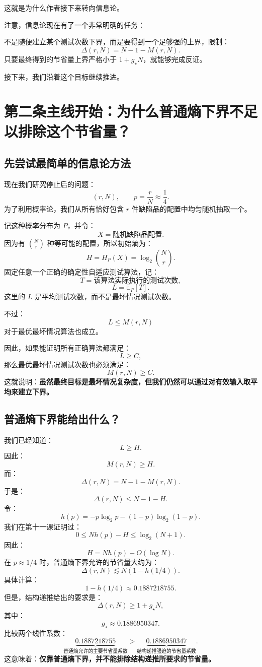 \documentclass[UTF8,11pt]{ctexart}
\begin{document}
这就是为什么作者接下来转向信息论。

注意，信息论现在有了一个非常明确的任务：

不是随便建立某个测试次数下界，而是要得到一个足够强的上界，限制：
\[\Delta(r,N)=N-1-M(r,N).\]
只要最终得到的节省量上界严格小于 $1+g_\star N$，就能够完成反证。

接下来，我们沿着这个目标继续推进。

\section{第二条主线开始：为什么普通熵下界不足以排除这个节省量？}
\subsection{先尝试最简单的信息论方法}
现在我们研究停止后的问题：
\[(r,N),\qquad p=\frac rN\approx\frac14.\]
为了利用概率论，我们从所有恰好包含 $r$ 件缺陷品的配置中均匀随机抽取一个。

记这种概率分布为 $P$，并令：
\[X=\text{随机缺陷品配置}.\]
因为有 $\binom Nr$ 种等可能的配置，所以初始熵为：
\begin{equation}\boxed{H=H_P(X)=\log_2\binom Nr.}\tag{12}\end{equation}
固定任意一个正确的确定性自适应测试算法，记：
\[T=\text{该算法实际执行的测试次数},\]
\[L=\mathbb E_P[T].\]
这里的 $L$ 是平均测试次数，而不是最坏情况测试次数。

不过：
\[L\le M(r,N)\]
对于最优最坏情况算法也成立。

因此，如果能证明所有正确算法都满足：
\[L\ge C,\]
那么最优最坏情况测试次数也必须满足：
\[M(r,N)\ge C.\]
这就说明：\textbf{虽然最终目标是最坏情况复杂度，但我们仍然可以通过对有效输入取平均来建立下界。}

\subsection{普通熵下界能给出什么？}
我们已经知道：
\[L\ge H.\]
因此：
\[M(r,N)\ge H.\]
而：
\[\Delta(r,N)=N-1-M(r,N).\]
于是：
\[\Delta(r,N)\le N-1-H.\]
令：
\[h(p)=-p\log_2p-(1-p)\log_2(1-p).\]
我们在第十一课证明过：
\[0\le Nh(p)-H\le\log_2(N+1).\]
因此：
\[H=Nh(p)-O(\log N).\]
在 $p\approx1/4$ 时，普通熵下界允许的节省量大约为：
\[\Delta(r,N)\lesssim N(1-h(1/4)).\]
具体计算：
\[1-h(1/4)\approx0.1887218755.\]
但是，结构递推给出的要求是：
\[\Delta(r,N)\ge1+g_\star N,\]
其中：
\[g_\star\approx0.1886950347.\]
比较两个线性系数：
\[
\underbrace{0.1887218755}_{\text{普通熵允许的主要节省量系数}}
>
\underbrace{0.1886950347}_{\text{结构递推强迫的节省量系数}}.
\]
这意味着：\textbf{仅靠普通熵下界，并不能排除结构递推所要求的节省量。}
\end{document}
